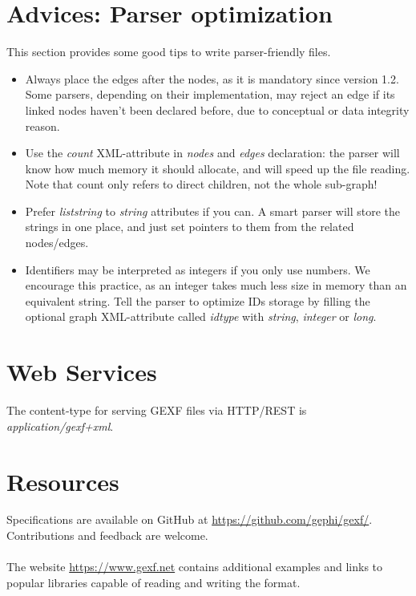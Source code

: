 \documentclass[a4paper,10pt]{article}
\begin{document}
\section{Advices: Parser optimization} \label{advices}

This section provides some good tips to write parser-friendly files.
\begin{itemize}
 \item Always place the edges after the nodes, as it is mandatory since version 1.2. Some parsers, depending on their implementation, may reject an edge if its linked nodes haven't been declared before, due to conceptual or data integrity reason.
 \item Use the \textit{count} XML-attribute in \textit{nodes} and \textit{edges} declaration: the parser will know how much memory it should allocate, and will speed up the file reading. Note that count only refers to direct children, not the whole sub-graph!
 \item Prefer \textit{liststring} to \textit{string} attributes if you can. A smart parser will store the strings in one place, and just set pointers to them from the related nodes/edges.
 \item Identifiers may be interpreted as integers if you only use numbers. We encourage this practice, as an integer takes much less size in memory than an equivalent string. Tell the parser to optimize IDs storage by filling the optional graph XML-attribute called \textit{idtype} with \textit{string}, \textit{integer} or \textit{long}.
\end{itemize}

\section{Web Services} \label{ws}

The content-type for serving GEXF files via HTTP/REST is \textit{application/gexf+xml}.

\section{Resources} \label{resources}

Specifications are available on GitHub at \href{https://github.com/gephi/gexf/}{https://github.com/gephi/gexf/}. Contributions and feedback are welcome.

\paragraph{}
The website \href{https://www.gexf.net}{https://www.gexf.net} contains additional examples and links to popular libraries capable of reading and writing the format.
\end{document}
